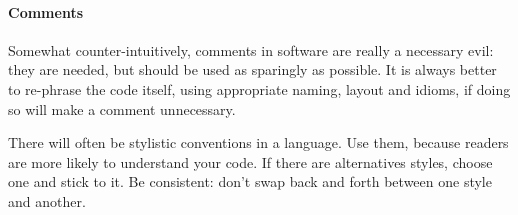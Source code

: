 \paragraph{Comments} Somewhat counter-intuitively, comments in software are really a necessary evil: they are needed, but should be used as sparingly as possible. It is always better to re-phrase the code itself, using appropriate naming, layout and idioms, if doing so will make a comment unnecessary.

There will often be stylistic conventions in a language. Use them, because readers are more likely to understand your code. If there are alternatives styles, choose one and stick to it. Be consistent: don't swap back and forth between one style and another. 

